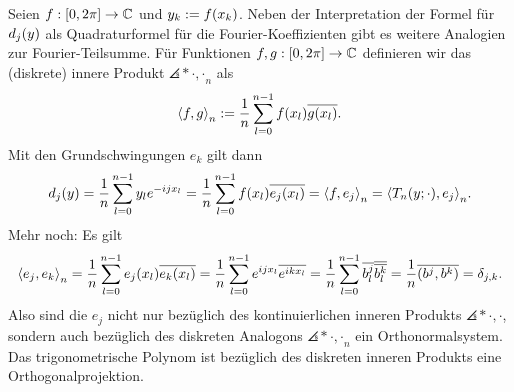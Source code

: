\documentclass{lecture}
\begin{document}
    \begin{remark}
        Seien \(f: \brackets*{0, 2\pi} \to \C\) und \(y_k := f\parentheses*{x_k}\).
        Neben der Interpretation der Formel für \(d_j\parentheses*{y}\) als Quadraturformel für die Fourier-Koeffizienten gibt es weitere Analogien zur Fourier-Teilsumme.
        Für Funktionen \(f, g: \brackets*{0, 2\pi} \to \C\) definieren wir das (diskrete) innere Produkt \(\angles*{\cdot, \cdot}_n\) als
        \[
            \angles*{f, g}_n := \frac{1}{n}\sum_{l = 0}^{n - 1}f\parentheses*{x_l}\overline{g\parentheses*{x_l}}.
        \]
        Mit den Grundschwingungen \(e_k\) gilt dann
        \[
            d_j\parentheses*{y} = \frac{1}{n}\sum_{l = 0}^{n - 1}y_l e^{-ijx_l} = \frac{1}{n}\sum_{l = 0}^{n - 1}f\parentheses*{x_l}\overline{e_j\parentheses*{x_l}} = \angles*{f, e_j}_n = \angles*{T_n\parentheses*{y; \cdot}, e_j}_n.
        \]
        Mehr noch: Es gilt
        \[
            \angles*{e_j, e_k}_n = \frac{1}{n}\sum_{l = 0}^{n - 1}e_j\parentheses*{x_l}\overline{e_k\parentheses*{x_l}} = \frac{1}{n}\sum_{l = 0}^{n - 1}e^{ijx_l}\overline{e^{ikx_l}} = \frac{1}{n}\sum_{l = 0}^{n - 1}\overline{b_l^j}\overline{\overline{b_l^k}} = \frac{1}{n}\overline{\parentheses*{b^j, b^k}} = \delta_{j, k}.
        \]
        Also sind die \(e_j\) nicht nur bezüglich des kontinuierlichen inneren Produkts \(\angles*{\cdot, \cdot}\), sondern auch bezüglich des diskreten Analogons \(\angles*{\cdot, \cdot}_n\) ein Orthonormalsystem.
        Das trigonometrische Polynom ist bezüglich des diskreten inneren Produkts eine Orthogonalprojektion.
    \end{remark}
\end{document}
